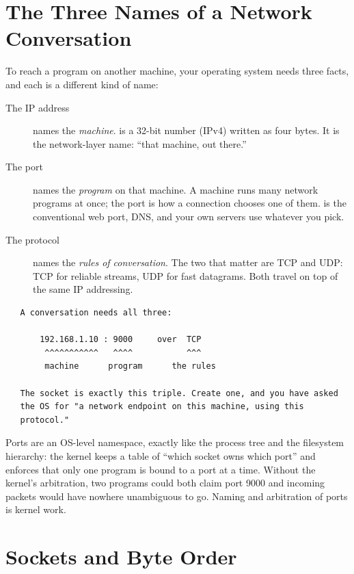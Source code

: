 \section{The Three Names of a Network Conversation}

To reach a program on another machine, your operating system needs
three facts, and each is a different kind of name:

\begin{description}
  \item[The IP address] names the \emph{machine}. 
    is a 32-bit number (IPv4) written as four bytes. It is the
    network-layer name: ``that machine, out there.''
  \item[The port] names the \emph{program} on that machine. A machine
    runs many network programs at once; the port is how a connection
    chooses one of them.  is the conventional web port,
     DNS, and your own servers use whatever you pick.
  \item[The protocol] names the \emph{rules of conversation}. The two
    that matter are TCP and UDP: TCP for reliable streams, UDP for
    fast datagrams. Both travel on top of the same IP addressing.
\end{description}

\begin{verbatim}
   A conversation needs all three:

       192.168.1.10 : 9000     over  TCP
        ^^^^^^^^^^^   ^^^^           ^^^
        machine      program      the rules

   The socket is exactly this triple. Create one, and you have asked
   the OS for "a network endpoint on this machine, using this
   protocol."
\end{verbatim}

\begin{osconcept}
Ports are an OS-level namespace, exactly like the process tree and the
filesystem hierarchy: the kernel keeps a table of ``which socket owns
which port'' and enforces that only one program is bound to a port at
a time. Without the kernel's arbitration, two programs could both
claim port 9000 and incoming packets would have nowhere unambiguous to
go. Naming and arbitration of ports is kernel work.
\end{osconcept}

\section{Sockets and Byte Order}

